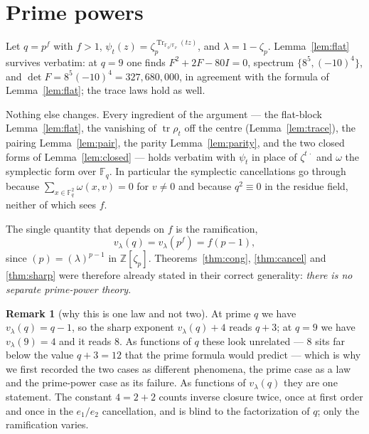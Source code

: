 \documentclass[11pt]{article}
\theoremstyle{plain}
\theoremstyle{definition}
\newtheorem{remark}[theorem]{Remark}
\newcommand{\FF}{\mathbb F}
\newcommand{\ZZ}{\mathbb Z}
\newcommand{\tr}{\operatorname{tr}}
\newcommand{\vlam}{v_\lambda}
\begin{document}
\section{Prime powers}\label{sec:pf}

Let $q=p^f$ with $f>1$, $\psi_t(z)=\zeta_p^{\operatorname{Tr}_{\FF_q/\FF_p}(tz)}$,
and $\lambda=1-\zeta_p$. Lemma~\ref{lem:flat} survives verbatim: at $q=9$ one
finds $F^2+2F-80I=0$, spectrum $\{8^5,(-10)^4\}$, and
$\det F=8^5(-10)^4=327{,}680{,}000$, in agreement with the formula of
Lemma~\ref{lem:flat}; the trace laws hold as well.

Nothing else changes. Every ingredient of the argument --- the flat-block
Lemma~\ref{lem:flat}, the vanishing of $\tr\rho_t$ off the centre
(Lemma~\ref{lem:trace}), the pairing Lemma~\ref{lem:pair}, the parity
Lemma~\ref{lem:parity}, and the two closed forms of Lemma~\ref{lem:closed} ---
holds verbatim with $\psi_t$ in place of $\zeta^{t\,\cdot}$ and $\omega$ the
symplectic form over $\FF_q$. In particular the symplectic cancellations go
through because $\sum_{x\in\FF_q^2}\omega(x,v)=0$ for $v\neq0$ and because
$q^{2}\equiv0$ in the residue field, neither of which sees $f$.

The single quantity that depends on $f$ is the ramification,
\[
\vlam(q)=\vlam(p^{f})=f(p-1),
\]
since $(p)=(\lambda)^{p-1}$ in $\ZZ[\zeta_p]$. Theorems~\ref{thm:cong},
\ref{thm:cancel} and \ref{thm:sharp} were therefore already stated in their
correct generality: \emph{there is no separate prime-power theory}.

\begin{remark}[why this is one law and not two]
At prime $q$ we have $\vlam(q)=q-1$, so the sharp exponent
$\vlam(q)+4$ reads $q+3$; at $q=9$ we have $\vlam(9)=4$ and it reads $8$. As
functions of $q$ these look unrelated --- $8$ sits far below the value
$q+3=12$ that the prime formula would predict --- which is why we first
recorded the two cases as different phenomena, the prime case as a law and the
prime-power case as its failure. As functions of $\vlam(q)$ they are one
statement. The constant $4=2+2$ counts inverse closure twice, once at first
order and once in the $e_1/e_2$ cancellation, and is blind to the
factorization of $q$; only the ramification varies.
\end{remark}
\end{document}
